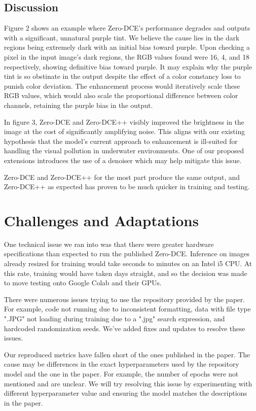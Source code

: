 \documentclass[11pt, letterpaper]{article}
\begin{document}
\subsection{Discussion}

Figure 2 shows an example where Zero-DCE's performance degrades and outputs with a significant, unnatural purple tint. We believe the cause lies in the dark regions being extremely dark with an initial bias toward purple. Upon checking a pixel in the input image's dark regions, the RGB values found were 16, 4, and 18 respectively, showing definitive bias toward purple. It may explain why the purple tint is so obstinate in the output despite the effect of a color constancy loss to punish color deviation. The enhancement process would iteratively scale these RGB values, which would also scale the proportional difference between color channels, retaining the purple bias in the output.

In figure 3, Zero-DCE and Zero-DCE++ visibly improved the brightness in the image at the cost of significantly amplifying noise. This aligns with our existing hypothesis that the model's current approach to enhancement is ill-suited for handling the visual pollution in underwater environments. One of our proposed extensions introduces the use of a denoiser which may help mitigate this issue.

Zero-DCE and Zero-DCE++ for the most part produce the same output, and Zero-DCE++ as expected has proven to be much quicker in training and testing.

\section{Challenges and Adaptations}

One technical issue we ran into was that there were greater hardware specifications than expected to run the published Zero-DCE. Inference on images already resized for training would take seconds to minutes on an Intel i5 CPU. At this rate, training would have taken days straight, and so the decision was made to move testing onto Google Colab and their GPUs.

There were numerous issues trying to use the repository provided by the paper. For example, code not running due to inconsistent formatting, data with file type ".JPG" not loading during training due to a ".jpg" search expression, and hardcoded randomization seeds. We've added fixes and updates to resolve these issues.

Our reproduced metrics have fallen short of the ones published in the paper. The cause may be differences in the exact hyperparameters used by the repository model and the one in the paper. For example, the number of epochs were not mentioned and are unclear. We will try resolving this issue by experimenting with different hyperparameter value and ensuring the model matches the descriptions in the paper.
\end{document}
